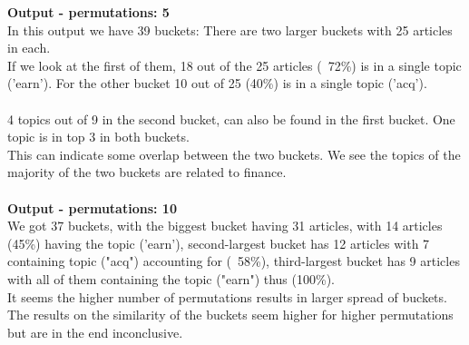 \documentclass{article}
\begin{document}
\textbf{Output - permutations: 5}\\
In this output we have 39 buckets: There are two larger buckets with 25 articles in each. ~\\
If we look at the first of them, 18 out of the 25 articles (~72\%) is in a single topic ('earn'). For the other bucket 10 out of 25 (40\%) is in a single topic ('acq'). \\
~\\
4 topics out of 9 in the second bucket, can also be found in the first bucket. One topic is in top 3 in both buckets. ~\\
This can indicate some overlap between the two buckets. We see the topics of the majority of the two buckets are related to finance. \\
~\\
\textbf{Output - permutations: 10}\\
We got 37 buckets, with the biggest bucket having 31 articles, with 14 articles (45\%) having the topic ('earn'), second-largest bucket has 12 articles with 7 containing topic ("acq") accounting for (~58\%), third-largest bucket has 9 articles with all of them containing the topic ("earn") thus (100\%).
~\\

It seems the higher number of permutations results in larger spread of buckets.
The results on the similarity of the buckets seem higher for higher permutations but are in the end inconclusive.
\end{document}
